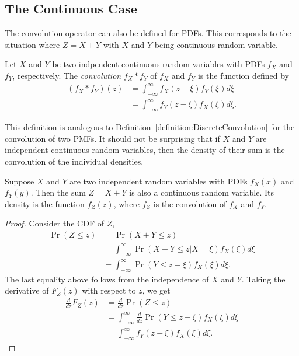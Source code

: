 \subsection{The Continuous Case}

The convolution operator can also be defined for PDFs.
This corresponds to the situation where $Z = X+Y$ with $X$ and $Y$ being continuous random variable.

\begin{definition} \label{definition:ContinuousConvolution}
Let $X$ and $Y$ be two indpendent continuous random variables with PDFs $f_X$ and $f_Y$, respectively.
The \emph{convolution} $f_X * f_Y$ of $f_X$ and $f_Y$ is the function defined by
\begin{equation*}
\begin{split}
(f_X * f_Y) (z) &= \int_{-\infty}^{\infty} f_X(z - \xi) f_Y(\xi) d\xi \\
&= \int_{-\infty}^{\infty} f_Y(z - \xi) f_X(\xi) d\xi .
\end{split}
\end{equation*}
\end{definition}

This definition is analogous to Definition~\ref{definition:DiscreteConvolution} for the convolution of two PMFs.
It should not be surprising that if $X$ and $Y$ are independent continuous random variables, then the density of their sum is the convolution of the individual densities.

\begin{theorem}
Suppose $X$ and $Y$ are two independent random variables with PDFs $f_X(x)$ and $f_Y(y)$.
Then the sum $Z = X + Y$ is also a continuous random variable.
Its density is the function $f_Z(z)$, where $f_Z$ is the convolution of $f_X$ and $f_Y$.
\end{theorem}
\begin{proof}
Consider the CDF of $Z$,
\begin{equation*}
\begin{split}
\Pr (Z \leq z) &= \Pr (X + Y \leq z) \\
&= \int_{-\infty}^{\infty} \Pr (X + Y \leq z | X = \xi) f_X(\xi) d\xi \\
&= \int_{-\infty}^{\infty} \Pr (Y \leq z - \xi) f_X(\xi) d\xi .
\end{split}
\end{equation*}
The last equality above follows from the independence of $X$ and $Y$.
Taking the derivative of $F_Z (z)$ with respect to $z$, we get
\begin{equation*}
\begin{split}
\frac{d}{dz} F_Z (z) &= \frac{d}{dz} \Pr (Z \leq z) \\
&= \int_{-\infty}^{\infty} \frac{d}{dz} \Pr (Y \leq z - \xi) f_X(\xi) d\xi \\
&= \int_{-\infty}^{\infty} f_Y (z - \xi) f_X(\xi) d\xi .
\end{split}
\end{equation*}
\end{proof}


